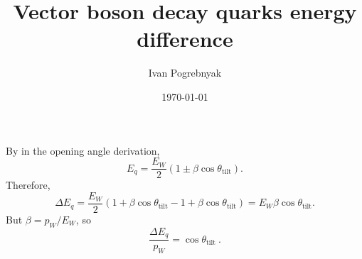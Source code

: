 \documentclass[12pt]{article}
\title{Vector boson decay quarks energy difference}
\author{Ivan Pogrebnyak}
\date{\today}
\def\tilt{\theta_{\mathrm{tilt}}}
\begin{document}
\maketitle

By  in the opening angle derivation,
\begin{equation}\label{eq:19}
  E_q = \frac{E_W}{2} (1 \pm \beta\cos\tilt). \tag{19}
\end{equation}
Therefore,
\begin{equation}
  \Delta E_q = \frac{E_W}{2} (1 + \beta\cos\tilt - 1 + \beta\cos\tilt)
  = E_W\beta\cos\tilt.
\end{equation}
But $\beta = p_W/E_W$, so
\begin{equation}
  \boxed{
    \frac{\Delta E_q}{p_W} = \cos\tilt
  }\ .
\end{equation}
\end{document}
